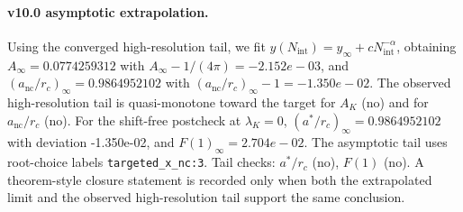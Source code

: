 \paragraph{v10.0 asymptotic extrapolation.}
Using the converged high-resolution tail, we fit $y(N_{\mathrm{int}})=y_{\infty}+cN_{\mathrm{int}}^{-\alpha}$, obtaining $A_\infty=0.0774259312$ with $A_\infty-1/(4\pi)=-2.152e-03$, and $(a_{\mathrm{nc}}/r_c)_\infty=0.9864952102$ with $(a_{\mathrm{nc}}/r_c)_\infty-1=-1.350e-02$. The observed high-resolution tail is quasi-monotone toward the target for $A_K$ (no) and for $a_{\mathrm{nc}}/r_c$ (no). For the shift-free postcheck at $\lambda_K=0$, $(a^*/r_c)_\infty=0.9864952102$ with deviation -1.350e-02, and $F(1)_\infty=2.704e-02$. The asymptotic tail uses root-choice labels \texttt{targeted_x_nc:3}. Tail checks: $a^*/r_c$ (no), $F(1)$ (no). A theorem-style closure statement is recorded only when both the extrapolated limit and the
observed high-resolution tail support the same conclusion.
